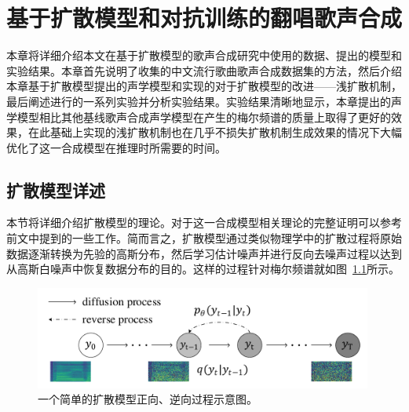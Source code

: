\newcommand{\etal}{\textit{et al}.}
\newcommand{\ie}{\textit{i}.\textit{e}.}
\newcommand{\vardbtilde}[1]{\tilde{\raisebox{0pt}[0.85\height]{$\tilde{#1}$}}}
\newcommand{\defeq}{\coloneqq}
\newcommand{\grad}{\nabla}
\newcommand{\E}{\mathbb{E}}
\newcommand{\Var}{\mathrm{Var}}
\newcommand{\Cov}{\mathrm{Cov}}
\newcommand{\Ea}[1]{\E\left[#1\right]}
\newcommand{\Eb}[2]{\E_{#1}\!\left[#2\right]}
\newcommand{\Vara}[1]{\Var\left[#1\right]}
\newcommand{\Varb}[2]{\Var_{#1}\left[#2\right]}
\newcommand{\kl}[2]{D_{\mathrm{KL}}\!\left(#1 ~ \| ~ #2\right)}
\newcommand{\pdata}{{p_\mathrm{data}}}
\newcommand{\bA}{\mathbf{A}}
\newcommand{\bI}{\mathbf{I}}
\newcommand{\bJ}{\mathbf{J}}
\newcommand{\bH}{\mathbf{H}}
\newcommand{\bL}{\mathbf{L}}
\newcommand{\bM}{\mathbf{M}}
\newcommand{\bQ}{\mathbf{Q}}
\newcommand{\bR}{\mathbf{R}}
\newcommand{\bzero}{\mathbf{0}}
\newcommand{\bone}{\mathbf{1}}
\newcommand{\bb}{\mathbf{b}}
\newcommand{\bu}{\mathbf{u}}
\newcommand{\bv}{\mathbf{v}}
\newcommand{\bw}{\mathbf{w}}
\newcommand{\bx}{\mathbf{x}}
\newcommand{\by}{\mathbf{y}}
\newcommand{\bz}{\mathbf{z}}
\newcommand{\bxh}{\hat{\mathbf{x}}}
\newcommand{\btheta}{{\boldsymbol{\theta}}}
\newcommand{\bphi}{{\boldsymbol{\phi}}}
\newcommand{\bepsilon}{{\boldsymbol{\epsilon}}}
\newcommand{\bmu}{{\boldsymbol{\mu}}}
\newcommand{\bnu}{{\boldsymbol{\nu}}}
\chapter{基于扩散模型和对抗训练的翻唱歌声合成}
\label{sec:svs}
本章将详细介绍本文在基于扩散模型的歌声合成研究中使用的数据、提出的模型和实验结果。本章首先说明了收集的中文流行歌曲歌声合成数据集的方法，然后介绍本章基于扩散模型提出的声学模型和实现的对于扩散模型的改进——浅扩散机制，最后阐述进行的一系列实验并分析实验结果。实验结果清晰地显示，本章提出的声学模型相比其他基线歌声合成声学模型在产生的梅尔频谱的质量上取得了更好的效果，在此基础上实现的浅扩散机制也在几乎不损失扩散机制生成效果的情况下大幅优化了这一合成模型在推理时所需要的时间。
\section{扩散模型详述}
本节将详细介绍扩散模型的理论。对于这一合成模型相关理论的完整证明可以参考前文中提到的一些工作\citep{Ho2020ddpm,kong2021diffwave,song2021denoising}。简而言之，扩散模型通过类似物理学中的扩散过程将原始数据逐渐转换为先验的高斯分布，然后学习估计噪声并进行反向去噪声过程以达到从高斯白噪声中恢复数据分布的目的。这样的过程针对梅尔频谱就如图~\ref{fig:two_process}所示。
\begin{figure}[!h]
	\centering
	\includegraphics[width=0.99\textwidth]{figure/svs/diffusion-new.pdf}
	\caption{一个简单的扩散模型正向、逆向过程示意图。}
	\label{fig:two_process}
\end{figure}
